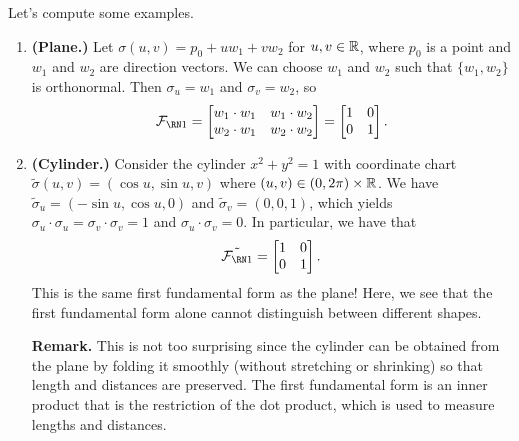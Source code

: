 Let's compute some examples. 
\begin{enumerate}[(1)]
    \item {\bf (Plane.)} Let $\sigma(u, v) = p_0 + uw_1 + vw_2$ for $u, v \in \mathbb{R}$, 
    where $p_0$ is a point and $w_1$ and $w_2$ are direction vectors. We can choose 
    $w_1$ and $w_2$ such that $\{w_1, w_2\}$ is orthonormal. Then 
    $\sigma_u = w_1$ and $\sigma_v = w_2$, so 
    \[ \FFF = \begin{bmatrix}
        w_1 \cdot w_1 & w_1 \cdot w_2 \\ 
        w_2 \cdot w_1 & w_2 \cdot w_2 
    \end{bmatrix} = \begin{bmatrix}
        1 & 0 \\ 0 & 1
    \end{bmatrix}. \] 

    \item {\bf (Cylinder.)} Consider the cylinder $x^2 + y^2 = 1$ with 
    coordinate chart $\tilde\sigma(u, v) = (\cos u, \sin u, v)$ where 
    $(u, v) \in (0, 2\pi) \times \mathbb{R}$. We have $\tilde\sigma_u 
    = (-\sin u, \cos u, 0)$ and $\tilde\sigma_v = (0, 0, 1)$, which yields 
    $\sigma_u \cdot \sigma_u = \sigma_v \cdot \sigma_v = 1$ 
    and $\sigma_u \cdot \sigma_v = 0$. In particular, we have that 
    \[ \tilde{\FFF} = \begin{bmatrix}
        1 & 0 \\ 0 & 1
    \end{bmatrix}. \] 
    This is the same first fundamental form as the plane! Here, 
    we see that the first fundamental form alone cannot distinguish 
    between different shapes. 

    {\bf Remark.} This is not too surprising since the cylinder can be obtained 
    from the plane by folding it smoothly (without stretching or shrinking) 
    so that length and distances are preserved. The first fundamental 
    form is an inner product that is the restriction of the dot product, 
    which is used to measure lengths and distances. 


\end{enumerate}
